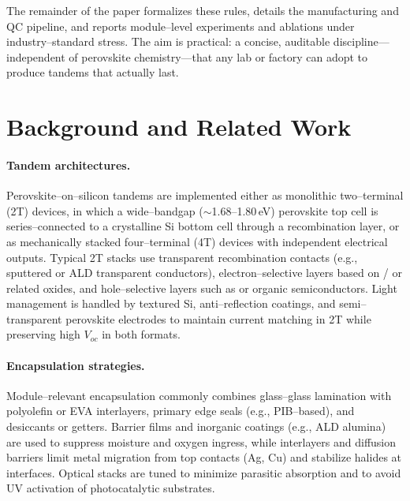 \documentclass[12pt]{article}
\begin{document}
The remainder of the paper formalizes these rules, details the manufacturing and QC pipeline, and reports module–level experiments and ablations under industry–standard stress. The aim is practical: a concise, auditable discipline—independent of perovskite chemistry—that any lab or factory can adopt to produce tandems that actually last.

\section{Background and Related Work}

\paragraph{Tandem architectures.}
Perovskite--on--silicon tandems are implemented either as monolithic two--terminal (2T) devices, in which a wide--bandgap ($\sim$1.68--1.80\,eV) perovskite top cell is series--connected to a crystalline Si bottom cell through a recombination layer, or as mechanically stacked four--terminal (4T) devices with independent electrical outputs. Typical 2T stacks use transparent recombination contacts (e.g., sputtered or ALD transparent conductors), electron--selective layers based on / or related oxides, and hole--selective layers such as  or organic semiconductors. Light management is handled by textured Si, anti--reflection coatings, and semi--transparent perovskite electrodes to maintain current matching in 2T while preserving high $V_{\!oc}$ in both formats.

\paragraph{Encapsulation strategies.}
Module--relevant encapsulation commonly combines glass--glass lamination with polyolefin or EVA interlayers, primary edge seals (e.g., PIB--based), and desiccants or getters. Barrier films and inorganic coatings (e.g., ALD alumina) are used to suppress moisture and oxygen ingress, while interlayers and diffusion barriers limit metal migration from top contacts (Ag, Cu) and stabilize halides at interfaces. Optical stacks are tuned to minimize parasitic absorption and to avoid UV activation of photocatalytic substrates.
\end{document}
